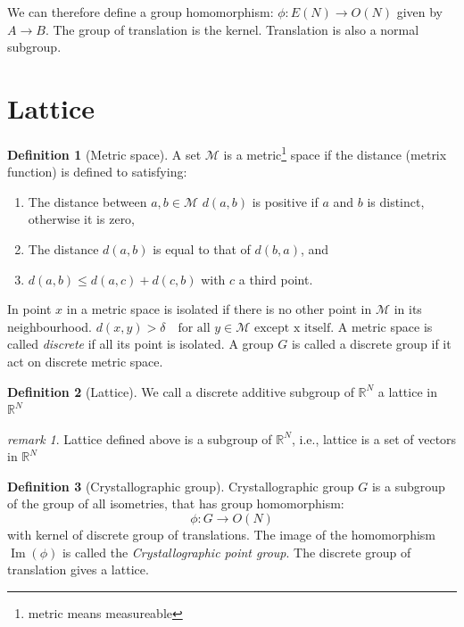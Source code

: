 \documentclass{amsart}
\newcommand{\setM}{\mathcal{M}}
\theoremstyle{remark}
\newtheorem*{remark}{remark}
\theoremstyle{remark}
\theoremstyle{definition}
\newtheorem*{definition}{Definition}
\DeclareMathOperator{\Image}{Im}
\begin{document}
We can therefore define a group homomorphism: $\phi\colon E(N)\to O(N)$ given by $A\to B$. 
The group of translation is the kernel. Translation is also a normal subgroup.

\vspace{10pt}
\section*{Lattice}
\begin{definition}
    [Metric space]
    A set $\setM$ is a metric\footnote{metric means measureable} space if the distance (metrix function) 
    is defined to satisfying:
    \begin{enumerate}
        \item The distance between $a, b \in \setM$ $d(a,b)$ is positive if $a$ and $b$ is distinct, otherwise it is zero,
        \item The distance $d(a,b)$ is equal to that of $d(b,a)$, and 
        \item $d(a,b) \leq d(a,c) + d(c,b)$ with $c$ a third point.
    \end{enumerate}
\end{definition}

In point $x$ in a metric space is isolated if there is no other point in $\setM$ in its 
neighbourhood. $d(x,y)> \delta \quad \text{for all } y\in\setM \text{ except x itself}$.
A metric space is called \emph{discrete} if all its point is isolated. A group $G$ is called 
a discrete group if it act on discrete metric space. 

\begin{definition}
    [Lattice]
    We call a discrete additive subgroup of $\mathbb{R}^N$ a lattice in $\mathbb{R}^N$
\end{definition}
\begin{remark}
Lattice defined above is a subgroup of $\mathbb{R}^N$, 
i.e., lattice is a set of vectors in $\mathbb{R}^N$
\end{remark}

\begin{definition}
    [Crystallographic group]
    Crystallographic group $G$ is a subgroup of the group of all isometries, that has group 
    homomorphism:
    \begin{equation*}
        \phi\colon G \to O(N)
    \end{equation*}
    with kernel of discrete group of translations. The image of the homomorphism $\Image(\phi)$
    is called the \emph{Crystallographic point group}. 
    The discrete group of translation gives a lattice.
\end{definition}
\end{document}

